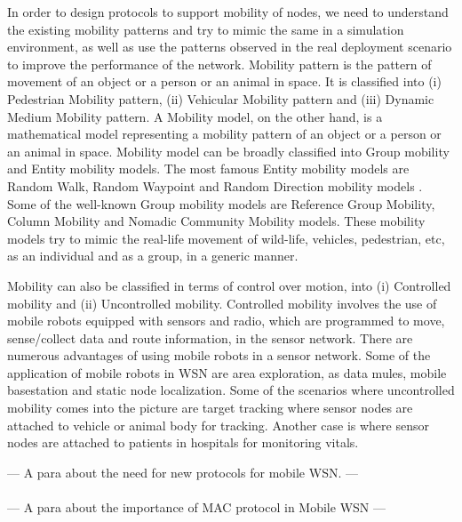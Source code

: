 \documentclass[a4paper, conference, 10pt]{IEEEtran}
\begin{document}
In order to design protocols to support mobility of nodes, we need to understand the existing mobility patterns and try to mimic the same in a simulation environment, as well as use the patterns observed in the real deployment scenario to improve the performance of the network. Mobility pattern is the pattern of movement of an object or a person or an animal in space. It is classified \cite{mobileMACSurvey} into (i) Pedestrian Mobility pattern, (ii) Vehicular Mobility pattern and (iii) Dynamic Medium Mobility pattern. A Mobility model, on the other hand, is a mathematical model representing a mobility pattern of an object or a person or an animal in space. Mobility model can be broadly classified into Group mobility and Entity mobility models. The most famous Entity mobility models are Random Walk, Random Waypoint and Random Direction mobility models \cite{mobModelsSurvey}. Some of the well-known Group mobility models are Reference Group Mobility, Column Mobility and Nomadic Community Mobility models. These mobility models try to mimic the real-life movement of wild-life, vehicles, pedestrian, etc, as an individual and as a group, in a generic manner. 

Mobility can also be classified in terms of control over motion, into (i) Controlled mobility and (ii) Uncontrolled mobility. Controlled mobility involves the use of mobile robots equipped with sensors and radio, which are programmed to move, sense/collect data and route information, in the sensor network. There are numerous advantages of using mobile robots in a sensor network. Some of the application of mobile robots in WSN are area exploration, as data mules, mobile basestation and static node localization. Some of the scenarios where uncontrolled mobility comes into the picture are target tracking where sensor nodes are attached to vehicle or animal body for tracking. Another case is where sensor nodes are attached to patients in hospitals for monitoring vitals.

--- A para about the need for new protocols for mobile WSN. --- \\ \\

--- A para about the importance of MAC protocol in Mobile WSN --- \\ \\
\end{document}
